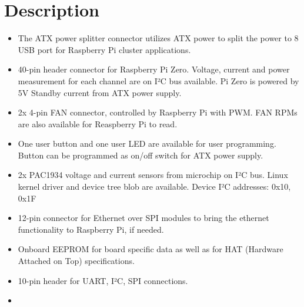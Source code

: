 \documentclass[a4paper,14pt,oneside,pdflatex,english,final,twocolumn]{article}
\begin{document}
\section{Description}
\begin{itemize}

	\item The ATX power splitter connector utilizes ATX power to split the power to 8 USB port for Raspberry Pi cluster applications.
	\item 40-pin header connector for Raspberry Pi Zero. Voltage, current and power measurement for each channel are on I²C bus available. Pi Zero is powered by 5V Standby current from ATX power supply.
	\item 2x 4-pin FAN connector, controlled by Raspberry Pi with PWM. FAN RPMs are also available for Reaspberry Pi to read. 
	\item One user button and one user LED are available for user programming. Button can be programmed as on/off switch for ATX power supply.
	\item 2x PAC1934 voltage and current sensors from microchip on I²C bus. Linux kernel driver and device tree blob are available. Device I²C addresses: 0x10, 0x1F
	\item 12-pin connector for Ethernet over SPI modules to bring the ethernet functionality to Raspberry Pi, if needed.
	\item Onboard EEPROM for board specific data as well as for HAT (Hardware Attached on Top) specifications.
	\item 10-pin header for UART, I²C, SPI connections.
	\item 
\end{itemize}
\end{document}
